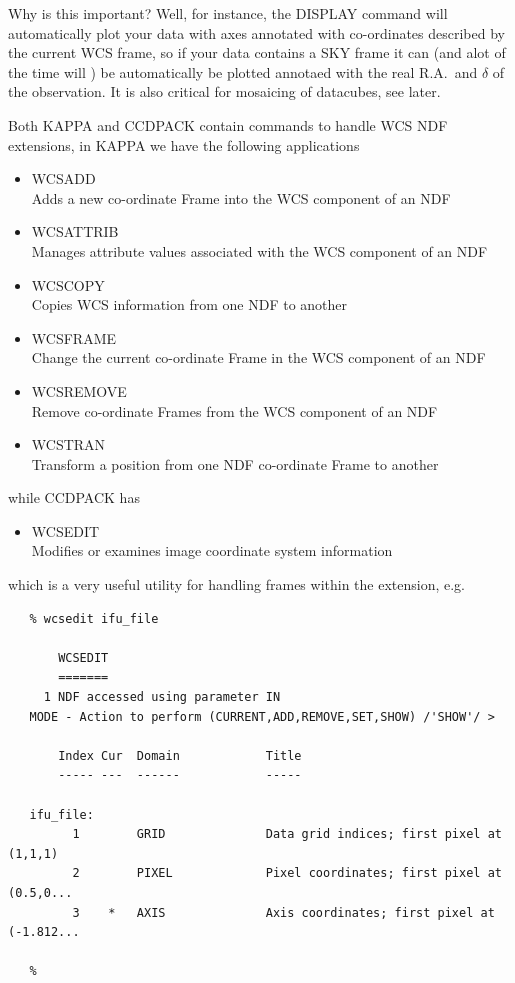 \documentclass[twoside,11pt]{article}
\newcommand{\htmlref}[2]{#1}
\newcommand{\xref}[3]{#1}
\begin{document}
Why is this important? Well, for instance, the \xref{DISPLAY}{sun95}{DISPLAY} command will automatically plot your data with axes annotated with co-ordinates described by the current WCS frame, so if your data contains a SKY frame it can (and alot of the time will ) be automatically be plotted annotaed with the real R.A.\ and $\delta$ of the observation. It is also critical for mosaicing of datacubes, see \htmlref{later}{sc16_mos}.

Both KAPPA and CCDPACK contain commands to handle WCS NDF extensions, in KAPPA we have the following applications

\begin{itemize}  
\item{\xref{WCSADD}{sun95}{WCSADD}}\\
Adds a new co-ordinate Frame into the WCS component of an NDF 
\item{\xref{WCSATTRIB}{sun95}{WCSATTRIB}}\\
Manages attribute values associated with the WCS component of an NDF
\item{\xref{WCSCOPY}{sun95}{WCSCOPY}}\\ 
Copies WCS information from one NDF to another 
\item{\xref{WCSFRAME}{sun95}{WCSFRAME}}\\ 
Change the current co-ordinate Frame in the WCS component of an NDF 
\item{\xref{WCSREMOVE}{sun95}{WCSREMOVE}}\\
Remove co-ordinate Frames from the WCS component of an NDF 
\item{\xref{WCSTRAN}{sun95}{WCSTRAN}}\\
Transform a position from one NDF co-ordinate Frame to another 
\end{itemize}

while CCDPACK has

\begin{itemize}  
\item{\xref{WCSEDIT}{sun139}{WCSEDIT}}\\
Modifies or examines image coordinate system information
\end{itemize}

which is a very useful utility for handling frames within the extension, e.g.

\small\begin{verbatim}
   % wcsedit ifu_file

       WCSEDIT
       =======
     1 NDF accessed using parameter IN
   MODE - Action to perform (CURRENT,ADD,REMOVE,SET,SHOW) /'SHOW'/ > 

       Index Cur  Domain            Title
       ----- ---  ------            -----

   ifu_file:
         1        GRID              Data grid indices; first pixel at (1,1,1)
         2        PIXEL             Pixel coordinates; first pixel at (0.5,0...
         3    *   AXIS              Axis coordinates; first pixel at (-1.812...

   %
\end{verbatim}\normalsize
\end{document}
